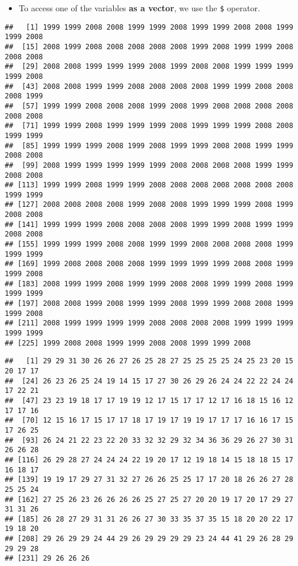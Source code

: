\documentclass[]{book}
\newenvironment{Shaded}{\begin{snugshade}}{\end{snugshade}}
\newcommand{\OperatorTok}[1]{\textcolor[rgb]{0.81,0.36,0.00}{\textbf{#1}}}
\newcommand{\NormalTok}[1]{#1}
\providecommand{\tightlist}{%
  \setlength{\itemsep}{0pt}\setlength{\parskip}{0pt}}
\begin{document}
\begin{itemize}
\tightlist
\item
  To access one of the variables \textbf{as a vector}, we use the
  \texttt{\$} operator.
\end{itemize}

\begin{Shaded}
\end{Shaded}

\begin{verbatim}
##   [1] 1999 1999 2008 2008 1999 1999 2008 1999 1999 2008 2008 1999 1999 2008
##  [15] 2008 1999 2008 2008 2008 2008 2008 1999 2008 1999 1999 2008 2008 2008
##  [29] 2008 2008 1999 1999 1999 2008 1999 2008 2008 1999 1999 1999 1999 2008
##  [43] 2008 2008 1999 1999 2008 2008 2008 2008 1999 1999 2008 2008 2008 1999
##  [57] 1999 1999 2008 2008 2008 1999 2008 1999 2008 2008 2008 2008 2008 2008
##  [71] 1999 1999 2008 1999 1999 1999 2008 1999 1999 1999 2008 2008 1999 1999
##  [85] 1999 1999 1999 2008 1999 2008 1999 1999 2008 2008 1999 1999 2008 2008
##  [99] 2008 1999 1999 1999 1999 1999 2008 2008 2008 2008 1999 1999 2008 2008
## [113] 1999 1999 2008 1999 1999 2008 2008 2008 2008 2008 2008 2008 1999 1999
## [127] 2008 2008 2008 2008 1999 2008 2008 1999 1999 1999 2008 1999 2008 2008
## [141] 1999 1999 1999 2008 2008 2008 2008 1999 1999 2008 1999 1999 2008 2008
## [155] 1999 1999 1999 2008 2008 1999 1999 2008 2008 2008 2008 1999 1999 1999
## [169] 1999 2008 2008 2008 2008 1999 1999 1999 1999 2008 2008 1999 1999 2008
## [183] 2008 1999 1999 2008 1999 1999 2008 2008 1999 1999 2008 1999 1999 1999
## [197] 2008 2008 1999 2008 1999 1999 2008 1999 1999 2008 2008 1999 1999 2008
## [211] 2008 1999 1999 1999 1999 2008 2008 2008 2008 1999 1999 1999 1999 1999
## [225] 1999 2008 2008 1999 1999 2008 2008 1999 1999 2008
\end{verbatim}

\begin{Shaded}
\end{Shaded}

\begin{verbatim}
##   [1] 29 29 31 30 26 26 27 26 25 28 27 25 25 25 25 24 25 23 20 15 20 17 17
##  [24] 26 23 26 25 24 19 14 15 17 27 30 26 29 26 24 24 22 22 24 24 17 22 21
##  [47] 23 23 19 18 17 17 19 19 12 17 15 17 17 12 17 16 18 15 16 12 17 17 16
##  [70] 12 15 16 17 15 17 17 18 17 19 17 19 19 17 17 17 16 16 17 15 17 26 25
##  [93] 26 24 21 22 23 22 20 33 32 32 29 32 34 36 36 29 26 27 30 31 26 26 28
## [116] 26 29 28 27 24 24 24 22 19 20 17 12 19 18 14 15 18 18 15 17 16 18 17
## [139] 19 19 17 29 27 31 32 27 26 26 25 25 17 17 20 18 26 26 27 28 25 25 24
## [162] 27 25 26 23 26 26 26 26 25 27 25 27 20 20 19 17 20 17 29 27 31 31 26
## [185] 26 28 27 29 31 31 26 26 27 30 33 35 37 35 15 18 20 20 22 17 19 18 20
## [208] 29 26 29 29 24 44 29 26 29 29 29 29 23 24 44 41 29 26 28 29 29 29 28
## [231] 29 26 26 26
\end{verbatim}
\end{document}
